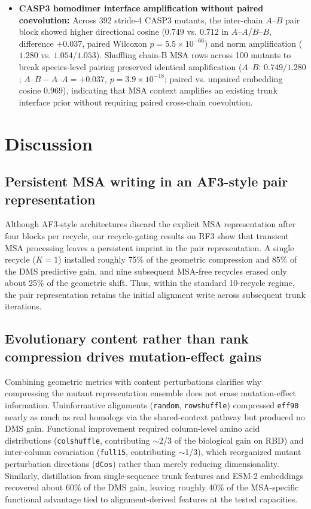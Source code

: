 \documentclass[10pt,a4paper]{article}
\begin{document}
\begin{itemize}
    \item \textbf{CASP3 homodimer interface amplification without paired coevolution:} Across 392 stride-4 CASP3 mutants, the inter-chain $A\text{--}B$ pair block showed higher directional cosine ($0.749$ vs. $0.712$ in $A\text{--}A$/$B\text{--}B$, difference $+0.037$, paired Wilcoxon $p = 5.5 \times 10^{-66}$) and norm amplification ($1.280$ vs. $1.054$/$1.053$). Shuffling chain-B MSA rows across 100 mutants to break species-level pairing preserved identical amplification ($A\text{--}B$: $0.749 / 1.280$; $A\text{--}B - A\text{--}A = +0.037$, $p = 3.9 \times 10^{-18}$; paired vs. unpaired embedding cosine $0.969$), indicating that MSA context amplifies an existing trunk interface prior without requiring paired cross-chain coevolution.
\end{itemize}

\section{Discussion}

\subsection{Persistent MSA writing in an AF3-style pair representation}
Although AF3-style architectures discard the explicit MSA representation after four blocks per recycle, our recycle-gating results on RF3 show that transient MSA processing leaves a persistent imprint in the pair representation. A single recycle ($K=1$) installed roughly 75\% of the geometric compression and 85\% of the DMS predictive gain, and nine subsequent MSA-free recycles erased only about 25\% of the geometric shift. Thus, within the standard 10-recycle regime, the pair representation retains the initial alignment write across subsequent trunk iterations.

\subsection{Evolutionary content rather than rank compression drives mutation-effect gains}
Combining geometric metrics with content perturbations clarifies why compressing the mutant representation ensemble does not erase mutation-effect information. Uninformative alignments (\texttt{random}, \texttt{rowshuffle}) compressed \texttt{eff90} nearly as much as real homologs via the shared-context pathway but produced no DMS gain. Functional improvement required column-level amino acid distributions (\texttt{colshuffle}, contributing $\sim$2/3 of the biological gain on RBD) and inter-column covariation (\texttt{full15}, contributing $\sim$1/3), which reorganized mutant perturbation directions (\texttt{dCos}) rather than merely reducing dimensionality. Similarly, distillation from single-sequence trunk features and ESM-2 embeddings recovered about 60\% of the DMS gain, leaving roughly 40\% of the MSA-specific functional advantage tied to alignment-derived features at the tested capacities.
\end{document}
